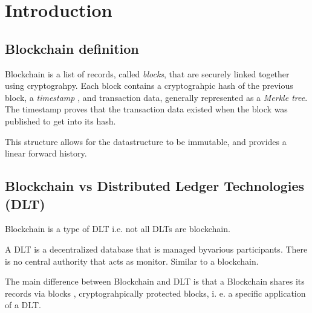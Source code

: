 \documentclass[a4paper, 12pt]{report}
\begin{document}
\chapter{Introduction}
\section{Blockchain definition}
Blockchain is a list of records, called \textit{blocks}, that are securely linked together
using cryptograhpy. Each block contains a cryptograhpic hash of the previous block, a \textit{timestamp}
, and transaction data, generally represented as a \textit{Merkle tree}. The timestamp proves
that the transaction data existed when the block was published to get into its hash.

This structure allows for the datastructure to be immutable, and provides a linear forward history.
\section{Blockchain vs Distributed Ledger Technologies (DLT)}
Blockchain is a type of DLT i.e. not all DLTs are blockchain.

A DLT is a decentralized database that is managed byvarious participants. There is no central
authority that acts as monitor. Similar to a blockchain.

The main difference between Blockchain and DLT is that a Blockchain shares its records via blocks
, cryptograhpically protected blocks, i. e. a specific application of a DLT.
\end{document}

